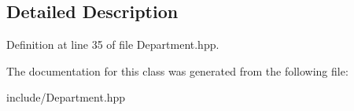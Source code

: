 \subsection{Detailed Description}


Definition at line 35 of file Department.\+hpp.



The documentation for this class was generated from the following file\+:\begin{DoxyCompactItemize}
\item 
include/Department.\+hpp\end{DoxyCompactItemize}

